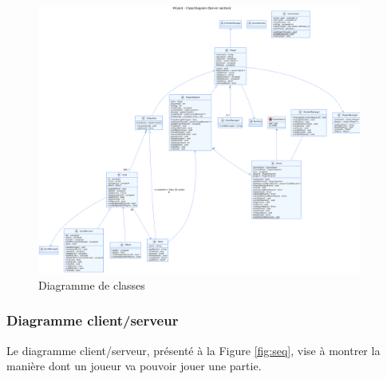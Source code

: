 \documentclass[11pt,a4paper]{article}
\begin{document}
\begin{figure}
  \centering
  \includegraphics[width=0.95\textwidth]{assets/uml/ClassDiagram2.png}
  \caption{\label{fig:class} Diagramme de classes}
\end{figure}

\subsubsection{Diagramme client/serveur}

Le diagramme client/serveur, présenté à la Figure \ref{fig:seq}, vise à montrer la manière dont un joueur va
pouvoir jouer une partie.
\end{document}
